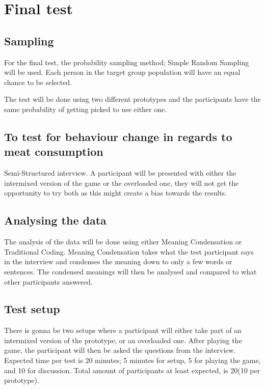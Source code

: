     \section{Final test}\label{methods:ft}
     \subsection{Sampling}
     For the final test, the probability sampling method; Simple Random Sampling will be used\cite{bjoernerBog}. Each person in the target group population will have an equal chance to be selected.
     
     The test will be done using two different prototypes and the participants have the same probability of getting picked to use either one. 
    
    \subsection{To test for behaviour change in regards to meat consumption}
    Semi-Structured interview\cite{bjoernerBog}. A participant will be presented with either the intermixed version of the game or the overloaded one, they will not get the opportunity to try both as this might create a bias towards the results.
    
    \subsection{Analysing the data}
    The analysis of the data will be done using either Meaning Condensation or Traditional Coding\cite{bjoernerBog}. Meaning Condensation takes what the test participant says in the interview and condenses the meaning down to only a few words or sentences. The condensed meanings will then be analysed and compared to what other participants answered. 
    
    \subsection{Test setup}
    There is gonna be two setups where a participant will either take part of an intermixed version of the prototype, or an overloaded one. After playing the game, the participant will then be asked the questions from the interview. Expected time per test is 20 minutes; 5 minutes for setup, 5 for playing the game, and 10 for discussion. Total amount of participants at least expected, is 20(10 per prototype).